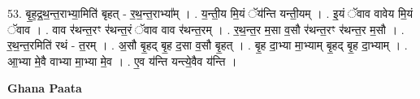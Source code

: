 \documentclass[17pt]{extarticle}
\begin{document}
53. बृ॒ह॒द्र॒थ॒न्त॒राभ्या॒मिति॑ बृहत् - र॒थ॒न्त॒राभ्या᳚म् । . य॒न्ती॒य मि॒यं ॅय॑न्ति यन्ती॒यम् । . इ॒यं ॅवाव वावेय मि॒यं ॅवाव । . वाव र॑थन्त॒रꣳ र॑थन्त॒रं ॅवाव वाव र॑थन्त॒रम् । . र॒थ॒न्त॒र म॒सा व॒सौ र॑थन्त॒रꣳ र॑थन्त॒र म॒सौ । . र॒थ॒न्त॒रमिति॑ रथं - त॒रम् । . अ॒सौ बृ॒हद् बृ॒ह द॒सा व॒सौ बृ॒हत् । . बृ॒ह दा॒भ्या मा॒भ्याम् बृ॒हद् बृ॒ह दा॒भ्याम् । . आ॒भ्या मे॒वै वाभ्या मा॒भ्या मे॒व । . ए॒व य॑न्ति यन्त्ये॒वैव य॑न्ति । \newline

\textbf{Ghana Paata } \newline
\end{document}
